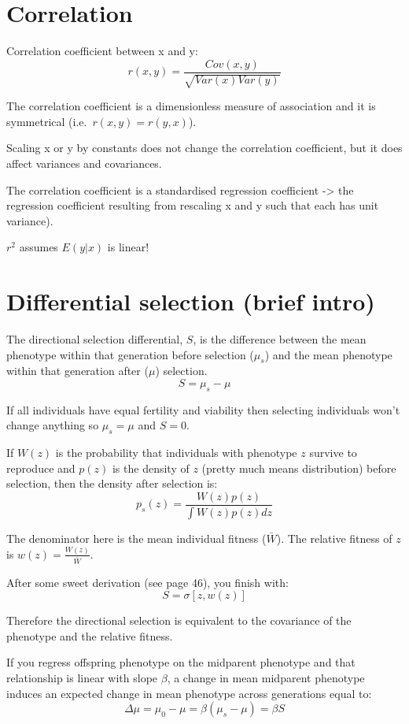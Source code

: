 \documentclass[
]{book}
\begin{document}
\hypertarget{correlation}{%
\section{Correlation}\label{correlation}}

Correlation coefficient between x and y:
\[r(x, y) = \frac{Cov(x, y)} {\sqrt{Var(x) Var(y)}}\]

The correlation coefficient is a dimensionless measure of association and it is symmetrical (i.e.~\(r(x, y) = r(y, x)\)).

Scaling x or y by constants does not change the correlation coefficient, but it does affect variances and covariances.

The correlation coefficient is a standardised regression coefficient -\textgreater{} the regression coefficient resulting from rescaling x and y such that each has unit variance).

\(r^2\) assumes \(E(y|x)\) is linear!

\hypertarget{differential-selection-brief-intro}{%
\section{Differential selection (brief intro)}\label{differential-selection-brief-intro}}

The directional selection differential, \(S\), is the difference between the mean phenotype within that generation before selection (\(\mu_s\)) and the mean phenotype within that generation after (\(\mu\)) selection.
\[S = \mu_s - \mu\]

If all individuals have equal fertility and viability then selecting individuals won't change anything so \(\mu_s = \mu\) and \(S = 0\).

If \(W(z)\) is the probability that individuals with phenotype \(z\) survive to reproduce and \(p(z)\) is the density of \(z\) (pretty much means distribution) before selection, then the density after selection is:
\[p_{s}(z) = \frac{W(z)p(z)} {\int W(z)p(z)dz}\]

The denominator here is the mean individual fitness (\(\bar{W}\)). The relative fitness of \(z\) is \(w(z) = \frac{W(z)} {\bar{W}}\).

After some sweet derivation (see page 46), you finish with:
\[S = \sigma[z, w(z)]\]

Therefore the directional selection is equivalent to the covariance of the phenotype and the relative fitness.

If you regress offspring phenotype on the midparent phenotype and that relationship is linear with slope \(\beta\), a change in mean midparent phenotype induces an expected change in mean phenotype across generations equal to:
\[\Delta\mu = \mu_0 - \mu = \beta(\mu_s - \mu) = \beta{S}\]
\end{document}
